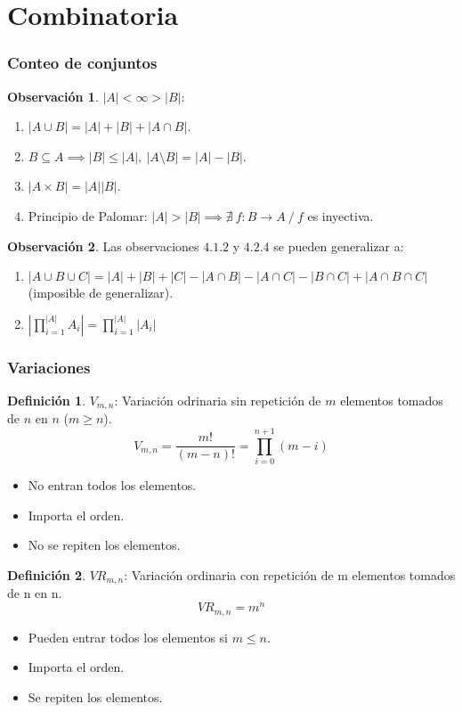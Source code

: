 \documentclass[10pt,a4paper]{article}
\theoremstyle{definition}
\newtheorem{definition}{Definición}[section]
\newtheorem{obs}{Observación}[section]
\begin{document}
\part{Combinatoria}
\section{Conteo de conjuntos}
\begin{obs} $|A|<\infty>|B|:$
	\begin{enumerate}
		\item $|A\cup B| = |A| + |B| + |A\cap B|$.
		\item $B\subseteq A \implies |B|\leq|A|,\:|A\setminus B| = |A|-|B|$.
		\item $|A\times B| = |A||B|$.
		\item Principio de Palomar: $|A|>|B|\implies\nexists\:f:B\to A\:/\:f $ es inyectiva.
		\end{enumerate}
\end{obs}
\begin{obs}
	Las observaciones $4.1.2$ y $4.2.4$ se pueden generalizar a:
	\begin{enumerate}
		\item $|A\cup B \cup C| = |A|+|B|+|C|-|A\cap B| - |A\cap C| - |B\cap C| + |A\cap B\cap C|$ (imposible de generalizar).
		\item $|\prod_{i=1}^{\scriptscriptstyle |A|}A_i| = \prod_{i=1}^{\scriptscriptstyle |A|}|A_i|$
	\end{enumerate}
\end{obs}

\section{Variaciones}
\begin{definition}
	$V_{m,n}$: Variación odrinaria sin repetición de $m$ elementos tomados de $n$ en $n$ ($m\geq n$).
	\[V_{m,n} = \frac{m!}{(m-n)!} = \prod_{i=0}^{n+1}(m-i)\]
	\begin{itemize}
		\item No entran todos los elementos.
		\item Importa el orden.
		\item No se repiten los elementos.
	\end{itemize}
\end{definition}
\begin{definition}
	$VR_{m,n}$: Variación ordinaria con repetición de m elementos tomados de n en n.
	\[VR_{m,n} = m^n\]
\begin{itemize}
	\item Pueden entrar todos los elementos si $m\leq n$.
	\item Importa el orden.
	\item Se repiten los elementos.
	\end{itemize}
\end{definition}
\end{document}

